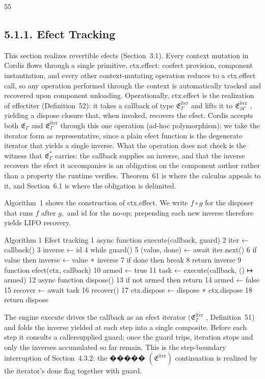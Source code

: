 \documentclass[
  10
]{article}
\begin{document}
55

\subsection{5.1.1. Efect Tracking}\label{efect-tracking}

This section realizes revertible efects (Section~3.1). Every context
mutation in Cordis flows through a single primitive, ctx.effect: coefect
provision, component instantiation, and every other context-mutating
operation reduces to a ctx.effect call, so any operation performed
through the context is automatically tracked and recovered upon
component unloading. Operationally, ctx.effect is the realization of
effectiter (Definition~52): it takes a callback of type
\({ \mathfrak { E } } _ { \Gamma } ^ { \mathrm { i t e r } }\) and lifts
it to
\({ \mathfrak { E } } _ { \partial \Gamma } ^ { \mathrm { i t e r } }\)
, yielding a dispose closure that, when invoked, recovers the efect.
Cordis accepts both \(\mathfrak { E } _ { \Gamma }\) and
\({ \mathfrak { E } } _ { \Gamma } ^ { \mathrm { i t e r } }\) through
this one operation (ad-hoc polymorphism); we take the iterator form as
representative, since a plain efect function is the degenerate iterator
that yields a single inverse. What the operation does not check is the
witness that \({ \mathfrak { E } } _ { \Gamma } ^ { * }\) carries: the
callback supplies an inverse, and that the inverse recovers the efect it
accompanies is an obligation on the component author rather than a
property the runtime verifies. Theorem~61 is where the calculus appeals
to it, and Section~6.1 is where the obligation is delimited.

Algorithm~1 shows the construction of ctx.effect. We write \(f \circ g\)
for the disposer that runs \(f\) after \({ \mathit { g } } ,\) and id
for the no-op; prepending each new inverse therefore yields LIFO
recovery.

Algorithm 1 Efect tracking 1 async function execute(callback, guard) 2
iter ← callback() 3 inverse ← id 4 while guard() 5 (value, done) ← await
iter.next() 6 if value then inverse ← value ∘ inverse 7 if done then
break 8 return inverse 9 function efect(ctx, callback) 10 armed ← true
11 task ← execute(callback, () ↦ armed) 12 async function dispose() 13
if not armed then return 14 armed ← false 15 recover ← await task 16
recover() 17 ctx.dispose ← dispose ∘ ctx.dispose 18 return dispose

The engine execute drives the callback as an efect iterator
\(( { \mathfrak { E } } _ { \Gamma } ^ { \mathrm { i t e r } }\) ,
Definition~51) and folds the inverse yielded at each step into a single
composite. Before each step it consults a callersupplied guard; once the
guard trips, iteration stops and only the inverses accumulated so far
remain. This is the step-boundary interruption of Section~4.3.2: the
����� \(( \mathfrak { E } ^ { \mathrm { i t e r } } )\) continuation is
realized by the iterator's done flag together with guard.
\end{document}
